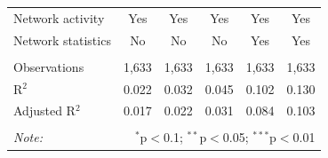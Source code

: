 \begin{table}[!htbp]
\begin{tabular}{@{\extracolsep{5pt}}lccccc}
 Network activity & Yes & Yes & Yes & Yes & Yes \\ 
 Network statistics & No & No & No & Yes & Yes \\ 
 \hline &  &  &  &  &  \\ 
 Observations & 1,633 & 1,633 & 1,633 & 1,633 & 1,633 \\ 
 R$^{2}$ & 0.022 & 0.032 & 0.045 & 0.102 & 0.130 \\ 
 Adjusted R$^{2}$ & 0.017 & 0.022 & 0.031 & 0.084 & 0.103 \\ 
\hline 
\hline \\[-1.8ex] 
\textit{Note:}  & \multicolumn{5}{r}{$^{*}$p$<$0.1; $^{**}$p$<$0.05; $^{***}$p$<$0.01} \\ 
\end{tabular} 
\end{table} 
